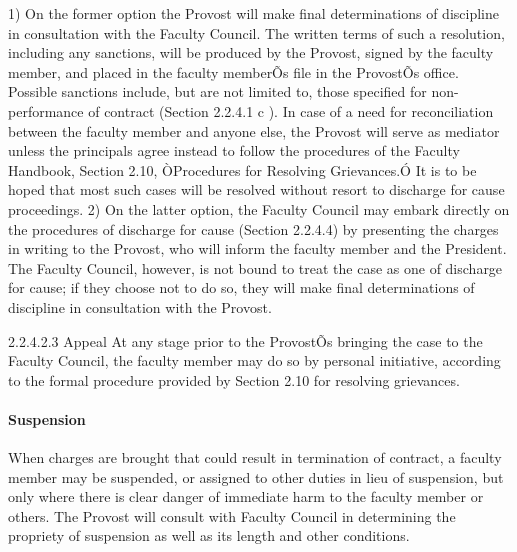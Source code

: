 \documentclass[letterpaper, 11pt]{article}
\begin{document}
\begin{enumerate}[label=\alph*)]
					1) On the former option the Provost will make final determinations of discipline in consultation with the Faculty Council.  The written terms of such a resolution, including any sanctions, will be produced by the Provost, signed by the faculty member, and placed in the faculty memberÕs file in the ProvostÕs office.  Possible sanctions include, but are not limited to, those specified for non-performance of contract (Section 2.2.4.1 c ).  In case of a need for reconciliation between the faculty member and anyone else, the Provost will serve as mediator unless the principals agree instead to follow the procedures of the Faculty Handbook, Section 2.10, ÒProcedures for Resolving Grievances.Ó  It is to be hoped that most such cases will be resolved without resort to discharge for cause proceedings.
					2) On the latter option, the Faculty Council may embark directly on the procedures of discharge for cause (Section 2.2.4.4) by presenting the charges in writing to the Provost, who will inform the faculty member and the President.  The Faculty Council, however, is not bound to treat the case as one of discharge for cause; if they choose not to do so, they will make final determinations of discipline in consultation with the Provost.
				\end{enumerate}
				2.2.4.2.3 Appeal
				At any stage prior to the ProvostÕs bringing the case to the Faculty Council, the faculty member may do so by personal initiative, according to the formal procedure provided by Section 2.10 for resolving grievances.
			\paragraph{Suspension}
				When charges are brought that could result in termination of contract, a faculty member may be suspended, or assigned to other duties in lieu of suspension, but only where there is clear danger of immediate harm to the faculty member or others.  The Provost will consult with Faculty Council in determining the propriety of suspension as well as its length and other conditions.
\end{document}
